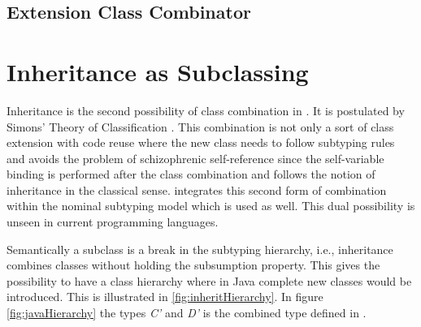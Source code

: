 \subsection{Extension Class Combinator}

%
%
%
%

\section{Inheritance as Subclassing}
Inheritance is the second possibility of class combination in \ooplss. It
is postulated by Simons' Theory of Classification \cite{simons_theory_2004-2}.
This combination is not only a sort of class extension with code reuse where
the new class needs to follow subtyping rules and avoids the problem of
schizophrenic self-reference since the self-variable binding is performed after
the class combination and follows the notion of inheritance in the
classical sense. \ooplss integrates this second form of combination within
the nominal subtyping model which is used as well. This dual possibility is
unseen in current programming languages.

Semantically a subclass is a break in the subtyping hierarchy, i.e., inheritance
combines classes without holding the subsumption property. This gives \ooplss
the possibility to have a class hierarchy where in Java complete new classes
would be introduced. This is illustrated in \cref{fig:inheritHierarchy}. In figure
\ref{fig:javaHierarchy} the types \emph{C'} and \emph{D'} is the combined type
defined in \ooplss.

